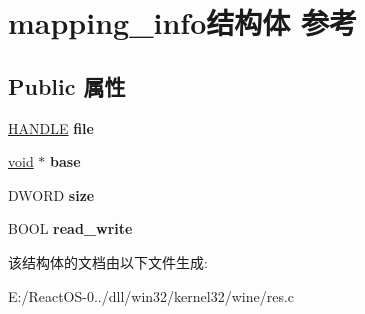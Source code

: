 \hypertarget{structmapping__info}{}\section{mapping\+\_\+info结构体 参考}
\label{structmapping__info}
\subsection*{Public 属性}
\begin{DoxyCompactItemize}
\item 
\mbox{\label{structmapping__info_ad51e01d988d4dd06f128badb307e0c7e}} 
\hyperlink{interfacevoid}{H\+A\+N\+D\+LE} {\bfseries file}
\item 
\mbox{\label{structmapping__info_acf529b8ee2e0af22f00b1b58d1f62cf8}} 
\hyperlink{interfacevoid}{void} $\ast$ {\bfseries base}
\item 
\mbox{\label{structmapping__info_a81de814af34de6ac6958ac33781043ee}} 
D\+W\+O\+RD {\bfseries size}
\item 
\mbox{\label{structmapping__info_a383944f5e41423baf3d83481e278f3d3}} 
B\+O\+OL {\bfseries read\+\_\+write}
\end{DoxyCompactItemize}


该结构体的文档由以下文件生成\+:\begin{DoxyCompactItemize}
\item 
E\+:/\+React\+O\+S-\/0../dll/win32/kernel32/wine/res.\+c\end{DoxyCompactItemize}
